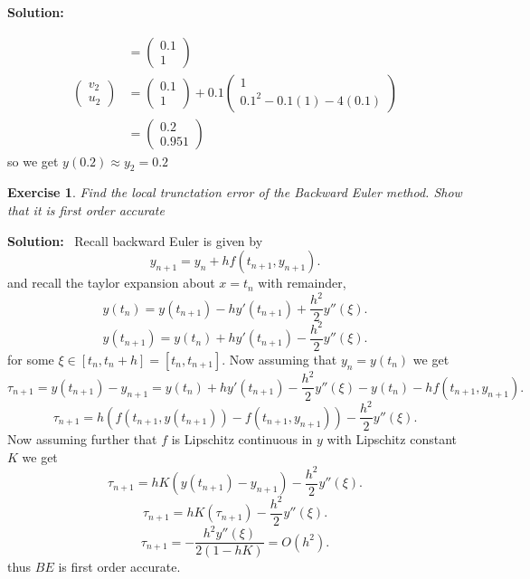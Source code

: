 \documentclass[a4paper,12pt]{scrartcl} %
\newenvironment{solution}
  {\par\color{answercolor}\textbf{Solution:}\ }
  {\par}
\newcounter{customcounter}
\theoremstyle{darktheorem}
\newtheorem{exercise}[customcounter]{Exercise}
\begin{document}
\begin{solution}
\begin{enumerate}
\begin{align*}
                &= \begin{pmatrix} 0.1 \\ 1 \end{pmatrix} \\
                \begin{pmatrix} v_2 \\ u_2 \end{pmatrix} &= \begin{pmatrix} 0.1 \\ 1 \end{pmatrix}  + 0.1 \begin{pmatrix} 1 \\ 0.1^2 - 0.1(1) - 4(0.1) \end{pmatrix} \\
                                                         &= \begin{pmatrix} 0.2 \\ 0.951 \end{pmatrix} 
            \end{align*}
            so we get $y(0.2) \approx y_2 = 0.2$
    \end{enumerate}
\end{solution}
\begin{exercise}
    Find the local trunctation error of the Backward Euler method. Show that it is first order accurate
\end{exercise}
\begin{solution}
    Recall backward Euler is given by
    \[
        y_{n+1} = y_n + hf(t_{n+1},y_{n+1})
    .\] 
    and recall the taylor expansion about $x=t_{n}$ with remainder, 
     \[
         y(t_{n}) = y(t_{n+1}) - hy'(t_{n+1}) + \frac{h^2}{2}y''(\xi) 
    .\] 
    \[
        y(t_{n+1}) = y(t_n) + hy'(t_{n+1}) - \frac{h^2}{2}y''(\xi)
    .\] 
    for some $\xi \in [t_n,t_n +h] = [t_n, t_{n+1}]$. Now assuming that $y_n = y(t_n)$ we get
     \[
         \tau_{n+1} = y(t_{n+1}) - y_{n+1} = y(t_n) + hy'(t_{n+1}) - \frac{h^2}{2}y''(\xi) - y(t_n) - hf(t_{n+1},y_{n+1})
    .\] 
    \[
        \tau_{n+1} = h(f(t_{n+1},y(t_{n+1}))-f(t_{n+1},y_{n+1})) - \frac{h^2}{2}y''(\xi)
    .\] 
    Now assuming further that $f$ is Lipschitz continuous in  $y$ with Lipschitz constant  $K$ we get
    \[
        \tau_{n+1} = hK(y(t_{n+1}) - y_{n+1}) - \frac{h^2}{2}y''(\xi)
    .\] 
    \[
        \tau_{n+1} = hK(\tau_{n+1}) - \frac{h^2}{2}y''(\xi)
    .\] 
    \[
        \tau_{n+1} = -\frac{h^2y''(\xi)}{2(1-hK)} = O(h^2)
    .\] 
    thus $BE$ is first order accurate.
\end{solution}
\end{document}
